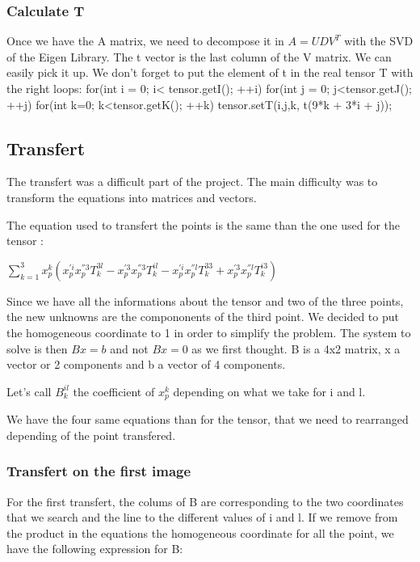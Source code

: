 \documentclass{report}
\begin{document}
\subsubsection{Calculate T}
Once we have the A matrix, we need to decompose it in $A=UDV^{T}$ with the SVD of the Eigen Library. The t vector is the last column of the V matrix. We can easily pick it up. 
We don't forget to put the element of t in the real tensor T with the right loops: 
for(int i = 0; i< tensor.getI(); ++i) {
      for(int j = 0; j<tensor.getJ(); ++j) {
        for(int k=0; k<tensor.getK(); ++k) {
          tensor.setT(i,j,k, t(9*k + 3*i + j));
        }
      }
    }



\subsection{Transfert}
The transfert was a difficult part of the project. The main difficulty was to transform the equations into matrices and vectors.

The equation used to transfert the points is the same than the one used for the tensor : 
\begin{center}
 $ \displaystyle { \sum_{k = 1}^{3}} x_{p}^{k}(x_{p}^{'i}x_{p}^{''3}T_{k}^{3l} - x_{p}^{'3}x_{p}^{''3}T_{k}^{il} - x_{p}^{'i}x_{p}^{''l}T_{k}^{33} + x_{p}^{'3}x_{p}^{''l}T_{k}^{i3})$ 
\end{center}

Since we have all the informations about the tensor and two of the three points, the new unknowns are the compononents of the third point. We decided to put the homogeneous coordinate to 1 in order to simplify the problem. The system to solve is then $Bx=b$ and not $Bx=0$ as we first thought. B is a 4x2 matrix, x a vector or 2 components and b a vector of 4 components. 

Let's call $B_{k}^{il}$ the coefficient of $x_{p}^{k}$ depending on what we take for i and l. 

We have the four same equations than for the tensor, that we need to rearranged depending of the point transfered.


\subsubsection{Transfert on the first image}
For the first transfert, the colums of B are corresponding to the two coordinates that we search and the line to the different values of i and l. If we remove from the product in the equations the homogeneous coordinate for all the point, we have the following expression for B:
\end{document}

